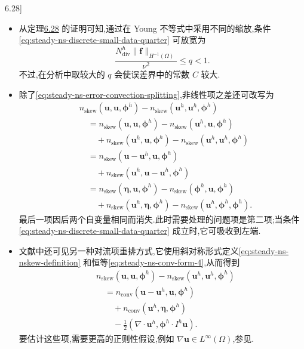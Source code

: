 \begin{note}[关于定理\hyperref[thm:steady-ns-fem-error-gradient]{6.28}]\label{note:steady-ns-error-gradient-discussion}
\begin{itemize}
  \item 从定理\hyperref[thm:steady-ns-fem-error-gradient]{6.28} 的证明可知,通过在 Young 不等式中采用不同的缩放,条件\cref{eq:steady-ns-discrete-small-data-quarter} 可放宽为
  \[
    \frac{N_{\mathrm{div}}^h\|\bm{f}\|_{H^{-1}(\Omega)}}{\nu^2}
      \le q<1.
  \]
  不过,在分析中取较大的 $q$ 会使误差界中的常数 $C$ 较大.
  \item 除了\cref{eq:steady-ns-error-convection-splitting},非线性项之差还可改写为
  \begin{equation}\label{eq:steady-ns-error-convection-splitting-alt}
  \begin{aligned}
    &n_{\mathrm{skew}}(\bm{u},\bm{u},\symbf{\phi}^h)
       -n_{\mathrm{skew}}(\bm{u}^h,\bm{u}^h,\symbf{\phi}^h)\\
    &\quad=n_{\mathrm{skew}}(\bm{u},\bm{u},\symbf{\phi}^h)
       -n_{\mathrm{skew}}(\bm{u}^h,\bm{u},\symbf{\phi}^h)\\
    &\qquad+n_{\mathrm{skew}}(\bm{u}^h,\bm{u},\symbf{\phi}^h)
       -n_{\mathrm{skew}}(\bm{u}^h,\bm{u}^h,\symbf{\phi}^h)\\
    &\quad=n_{\mathrm{skew}}(\bm{u}-\bm{u}^h,\bm{u},\symbf{\phi}^h)\\
    &\qquad+n_{\mathrm{skew}}(\bm{u}^h,\bm{u}-\bm{u}^h,\symbf{\phi}^h)\\
    &\quad=n_{\mathrm{skew}}(\symbf{\eta},\bm{u},\symbf{\phi}^h)
       -n_{\mathrm{skew}}(\symbf{\phi}^h,\bm{u},\symbf{\phi}^h)\\
    &\qquad+n_{\mathrm{skew}}(\bm{u}^h,\symbf{\eta},\symbf{\phi}^h)
       -n_{\mathrm{skew}}(\bm{u}^h,\symbf{\phi}^h,\symbf{\phi}^h).
  \end{aligned}
  \end{equation}
  最后一项因后两个自变量相同而消失.此时需要处理的问题项是第二项;当条件\cref{eq:steady-ns-discrete-small-data-quarter} 成立时,它可吸收到左端.
  \item 文献中还可见另一种对流项重排方式,它使用斜对称形式定义\cref{eq:steady-ns-nskew-definition} 和恒等\cref{eq:steady-ns-conv-form-4},从而得到
  \[
  \begin{aligned}
    &n_{\mathrm{skew}}(\bm{u},\bm{u},\symbf{\phi}^h)
      -n_{\mathrm{skew}}(\bm{u}^h,\bm{u}^h,\symbf{\phi}^h)\\
    &\quad=n_{\mathrm{conv}}(\bm{u}-\bm{u}^h,\bm{u},\symbf{\phi}^h)\\
    &\qquad+n_{\mathrm{conv}}(\bm{u}^h,\symbf{\eta},\symbf{\phi}^h)\\
    &\qquad-\frac12(\nabla\cdot\bm{u}^h,\symbf{\phi}^h\cdot I^h\bm{u}).
  \end{aligned}
  \]
  要估计这些项,需要更高的正则性假设,例如 $\nabla\bm{u}\in L^\infty(\Omega)$,参见\textcite{ArndtDallmannLube2015}.
\end{itemize}
\end{note}

